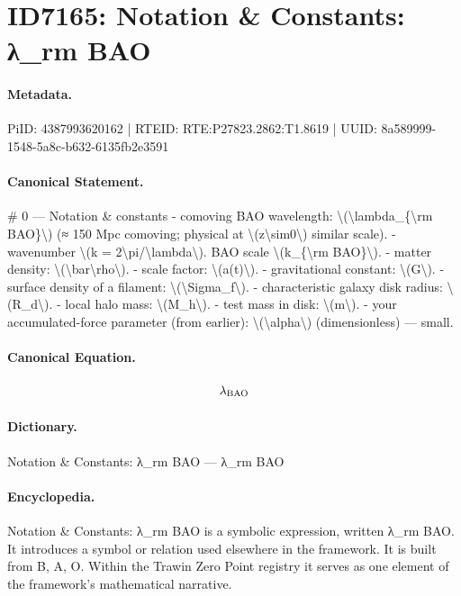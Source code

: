 \section*{ID7165: Notation \& Constants: λ\_rm BAO}
\paragraph{Metadata.}
PiID: 4387993620162 | RTEID: RTE:P27823.2862:T1.8619 | UUID: 8a589999-1548-5a8c-b632-6135fb2e3591

\paragraph{Canonical Statement.}
\# 0 — Notation \& constants - comoving BAO wavelength: \textbackslash{}(\textbackslash{}lambda\_\{\textbackslash{}rm BAO\}\textbackslash{}) (≈ 150 Mpc comoving; physical at \textbackslash{}(z\textbackslash{}sim0\textbackslash{}) similar scale). - wavenumber \textbackslash{}(k = 2\textbackslash{}pi/\textbackslash{}lambda\textbackslash{}). BAO scale \textbackslash{}(k\_\{\textbackslash{}rm BAO\}\textbackslash{}). - matter density: \textbackslash{}(\textbackslash{}bar\textbackslash{}rho\textbackslash{}). - scale factor: \textbackslash{}(a(t)\textbackslash{}). - gravitational constant: \textbackslash{}(G\textbackslash{}). - surface density of a filament: \textbackslash{}(\textbackslash{}Sigma\_f\textbackslash{}). - characteristic galaxy disk radius: \textbackslash{}(R\_d\textbackslash{}). - local halo mass: \textbackslash{}(M\_h\textbackslash{}). - test mass in disk: \textbackslash{}(m\textbackslash{}). - your accumulated-force parameter (from earlier): \textbackslash{}(\textbackslash{}alpha\textbackslash{}) (dimensionless) — small.

\paragraph{Canonical Equation.}
\[
\lambda_{\rm BAO}
\]

\paragraph{Dictionary.}
Notation \& Constants: λ\_rm BAO — λ\_rm BAO

\paragraph{Encyclopedia.}
Notation \& Constants: λ\_rm BAO is a symbolic expression, written λ\_rm BAO. It introduces a symbol or relation used elsewhere in the framework. It is built from B, A, O. Within the Trawin Zero Point registry it serves as one element of the framework's mathematical narrative.
